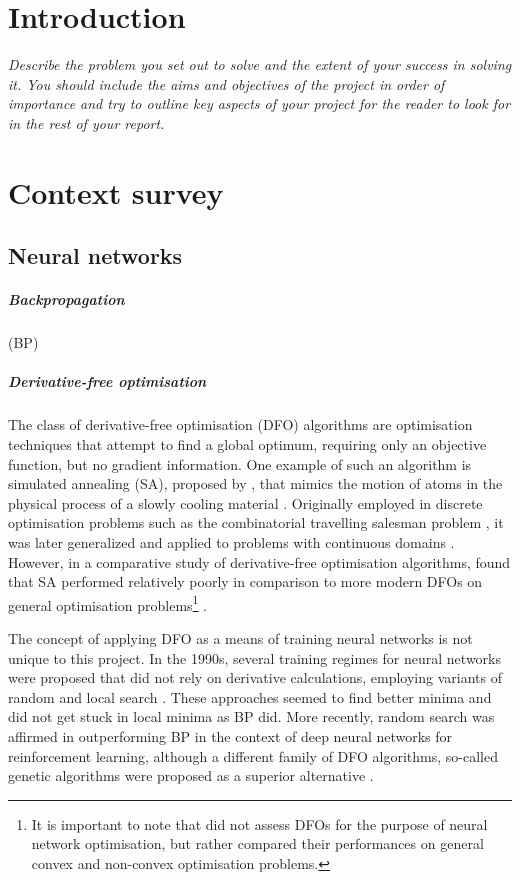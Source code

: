\chapter{Introduction}
\textit{Describe the problem you set out to solve and the
extent of your success in solving it. You should include
the aims and objectives of the project in order of
importance and try to outline key aspects of your
project for the reader to look for in the rest of your
report.}
\todo

\chapter{Context survey}
\section{Neural networks}

\paragraph{Backpropagation}
(BP)

\paragraph{Derivative-free optimisation}
The class of derivative-free optimisation (DFO) algorithms are optimisation techniques that attempt to find a global optimum, requiring only an objective function, but no gradient information.
One example of such an algorithm is simulated annealing (SA), proposed by \citeauthor{kirkpatrick1983}, that mimics the motion of atoms in the physical process of a slowly cooling material \cite*{kirkpatrick1983}.
Originally employed in discrete optimisation problems such as the combinatorial travelling salesman problem \cite{cerny1985}, it was later generalized and applied to problems with continuous domains \cite{belisle1993}.
However, in a comparative study of derivative-free optimisation algorithms, \citeauthor{rios2009} found that SA performed relatively poorly in comparison to more modern DFOs on general optimisation problems\footnote{It is important to note that \citeauthor{rios2009} did not assess DFOs for the purpose of neural network optimisation, but rather compared their performances on general convex and non-convex optimisation problems.} \cite*{rios2009}.

The concept of applying DFO as a means of training neural networks is not unique to this project.
In the 1990s, several training regimes for neural networks were proposed that did not rely on derivative calculations, employing variants of random and local search \cite{hirasawa1998,battiti1995}.
These approaches seemed to find better minima and did not get stuck in local minima as BP did. 
More recently, random search was affirmed in outperforming BP in the context of deep neural networks for reinforcement learning, although a different family of DFO algorithms, so-called genetic algorithms were proposed as a superior alternative \cite{such2017}.

